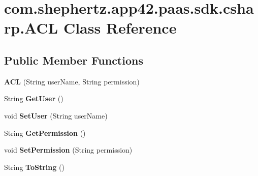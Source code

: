 \hypertarget{classcom_1_1shephertz_1_1app42_1_1paas_1_1sdk_1_1csharp_1_1_a_c_l}{\section{com.\+shephertz.\+app42.\+paas.\+sdk.\+csharp.\+A\+C\+L Class Reference}
\label{classcom_1_1shephertz_1_1app42_1_1paas_1_1sdk_1_1csharp_1_1_a_c_l}
}
\subsection*{Public Member Functions}
\begin{DoxyCompactItemize}
\item 
\hypertarget{classcom_1_1shephertz_1_1app42_1_1paas_1_1sdk_1_1csharp_1_1_a_c_l_a956984c6994be620649b2bc4d49423d4}{{\bfseries A\+C\+L} (String user\+Name, String permission)}\label{classcom_1_1shephertz_1_1app42_1_1paas_1_1sdk_1_1csharp_1_1_a_c_l_a956984c6994be620649b2bc4d49423d4}

\item 
\hypertarget{classcom_1_1shephertz_1_1app42_1_1paas_1_1sdk_1_1csharp_1_1_a_c_l_a8941b0e49eb18d26b215c4f450920e14}{String {\bfseries Get\+User} ()}\label{classcom_1_1shephertz_1_1app42_1_1paas_1_1sdk_1_1csharp_1_1_a_c_l_a8941b0e49eb18d26b215c4f450920e14}

\item 
\hypertarget{classcom_1_1shephertz_1_1app42_1_1paas_1_1sdk_1_1csharp_1_1_a_c_l_aeaeee9b6ead9b1daf30948b92b97c70d}{void {\bfseries Set\+User} (String user\+Name)}\label{classcom_1_1shephertz_1_1app42_1_1paas_1_1sdk_1_1csharp_1_1_a_c_l_aeaeee9b6ead9b1daf30948b92b97c70d}

\item 
\hypertarget{classcom_1_1shephertz_1_1app42_1_1paas_1_1sdk_1_1csharp_1_1_a_c_l_a9103c0c65379a37b51999775dce0ca16}{String {\bfseries Get\+Permission} ()}\label{classcom_1_1shephertz_1_1app42_1_1paas_1_1sdk_1_1csharp_1_1_a_c_l_a9103c0c65379a37b51999775dce0ca16}

\item 
\hypertarget{classcom_1_1shephertz_1_1app42_1_1paas_1_1sdk_1_1csharp_1_1_a_c_l_a3a773f8b1aa8c853628fa1d81affc87e}{void {\bfseries Set\+Permission} (String permission)}\label{classcom_1_1shephertz_1_1app42_1_1paas_1_1sdk_1_1csharp_1_1_a_c_l_a3a773f8b1aa8c853628fa1d81affc87e}

\item 
\hypertarget{classcom_1_1shephertz_1_1app42_1_1paas_1_1sdk_1_1csharp_1_1_a_c_l_ae1f6263cb370307104c9e5a27f6788e4}{String {\bfseries To\+String} ()}\label{classcom_1_1shephertz_1_1app42_1_1paas_1_1sdk_1_1csharp_1_1_a_c_l_ae1f6263cb370307104c9e5a27f6788e4}


\end{DoxyCompactItemize}

